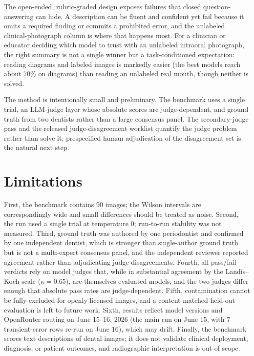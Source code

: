\documentclass[11pt]{article}
\begin{document}
The open-ended, rubric-graded design exposes failures that closed question-answering can hide. A description can be fluent and confident yet fail because it omits a required finding or commits a prohibited error, and the unlabeled clinical-photograph column is where that happens most. For a clinician or educator deciding which model to trust with an unlabeled intraoral photograph, the right summary is not a single winner but a task-conditioned expectation: reading diagrams and labeled images is markedly easier (the best models reach about 70\% on diagrams) than reading an unlabeled real mouth, though neither is solved.

The method is intentionally small and preliminary. The benchmark uses a single trial, an LLM-judge layer whose absolute scores are judge-dependent, and ground truth from two dentists rather than a large consensus panel. The secondary-judge pass and the released judge-disagreement worklist quantify the judge problem rather than solve it; prespecified human adjudication of the disagreement set is the natural next step.

\section{Limitations}

First, the benchmark contains 90 images; the Wilson intervals are correspondingly wide and small differences should be treated as noise. Second, the run used a single trial at temperature 0; run-to-run stability was not measured. Third, ground truth was authored by one periodontist and confirmed by one independent dentist, which is stronger than single-author ground truth but is not a multi-expert consensus panel, and the independent reviewer reported agreement rather than adjudicating judge disagreements. Fourth, all pass/fail verdicts rely on model judges that, while in substantial agreement by the Landis--Koch scale ($\kappa=0.65$), are themselves evaluated models, and the two judges differ enough that absolute pass rates are judge-dependent. Fifth, contamination cannot be fully excluded for openly licensed images, and a content-matched held-out evaluation is left to future work. Sixth, results reflect model versions and OpenRouter routing on June 15--16, 2026 (the main run on June 15, with 7 transient-error rows re-run on June 16), which may drift. Finally, the benchmark scores text descriptions of dental images; it does not validate clinical deployment, diagnosis, or patient outcomes, and radiographic interpretation is out of scope.
\end{document}
